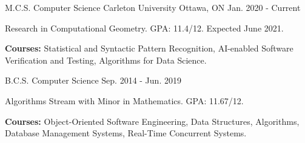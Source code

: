\begin{cventries}

\educationentry
{M.C.S. Computer Science}
{Carleton University}
{Ottawa, ON}
{Jan. 2020 - Current}
{\begin{cvitems}
    \item {Research in Computational Geometry. GPA: 11.4/12. Expected June 2021.}
    \item {\textbf{Courses:} Statistical and Syntactic Pattern Recognition, AI-enabled Software Verification and Testing, Algorithms for Data Science.}
\end{cvitems}}
{B.C.S. Computer Science}
{Sep. 2014 - Jun. 2019}
{\begin{cvitems}
    \item {Algorithms Stream with Minor in Mathematics. GPA: 11.67/12.}
    \item {\textbf{Courses:} Object-Oriented Software Engineering, Data Structures, Algorithms, Database Management Systems, Real-Time Concurrent Systems.}
\end{cvitems}}

\end{cventries}
